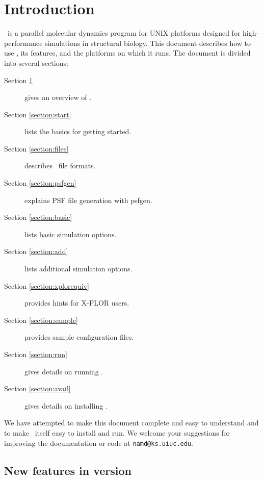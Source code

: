 

\section{Introduction}
\label{section:intro}

\NAMD\ is a parallel molecular dynamics program for UNIX 
platforms designed for high-performance 
simulations in structural biology.  This document describes how to use 
\NAMD, its features, and the platforms on which it runs.
The document is divided into several sections:
\begin{description}
\item[Section \ref{section:intro}] gives an overview of \NAMD.
\item[Section \ref{section:start}] lists the basics for getting started.
\item[Section \ref{section:files}] describes \NAMD\ file formats.
\item[Section \ref{section:psfgen}] explains PSF file generation with psfgen.
\item[Section \ref{section:basic}] lists basic simulation options.
\item[Section \ref{section:add}] lists additional simulation options.
\item[Section \ref{section:xplorequiv}] provides hints for X-PLOR users.
\item[Section \ref{section:sample}] provides sample configuration files.
\item[Section \ref{section:run}] gives details on running \NAMD.
\item[Section \ref{section:avail}] gives details on installing \NAMD.
\end{description}

We have attempted to make this document 
complete and easy to understand and to make \NAMD\ itself
easy to install and run.
We welcome your suggestions for improving the documentation or code
at {\tt namd@ks.uiuc.edu}.

\subsection{New features in version \NAMDVER}

